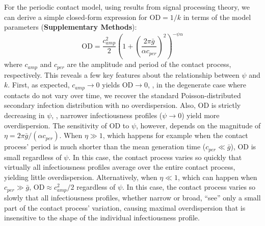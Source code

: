 For the periodic contact model, using results from signal processing theory, we can derive a simple closed-form expression for $\text{OD} = 1/k$ in terms of the model parameters ({\bf Supplementary Methods}): 
\begin{equation}
\text{OD} = \frac{c_{amp}^2}{2} \left(    1 + \left(    \frac{2 \pi \bar{g}}{\alpha c_{per}} \right)^2 \right)^{-\psi \alpha}
\label{eq:OD}
\end{equation}
where $c_{amp}$ and $c_{per}$ are the amplitude and period of the contact process, respectively. This reveals a few key features about the relationship between $\psi$ and $k$. First, as expected, $c_{amp} \rightarrow 0$ yields $\text{OD} \rightarrow 0$, \ie, in the degenerate case where contacts do not vary over time, we recover the standard Poisson-distributed secondary infection distribution with no overdispersion. Also, $\text{OD}$ is strictly decreasing in $\psi$, \ie, narrower infectiousness profiles ($\psi \rightarrow 0$) yield more overdispersion. The sensitivity of $\text{OD}$ to $\psi$, however, depends on the magnitude of $\eta = 2 \pi \bar{g} / (\alpha c_{per})$. When $\eta \gg 1$, which happens for example when the contact process' period is much shorter than the mean generation time ($c_{per} \ll \bar{g}$), $\text{OD}$ is small regardless of $\psi$. In this case, the contact process varies so quickly that virtually all infectiousness profiles average over the entire contact process, yielding little overdispersion. Alternatively, when $\eta \ll 1$, which can happen when $c_{per} \gg \bar{g}$, $\text{OD} \approx c_{amp}^2 / 2$ regardless of $\psi$. In this case, the contact process varies so slowly that all infectiousness profiles, whether narrow or broad, ``see'' only a small part of the contact process' variation, causing maximal overdispersion that is insensitive to the shape of the individual infectiousness profile. 

